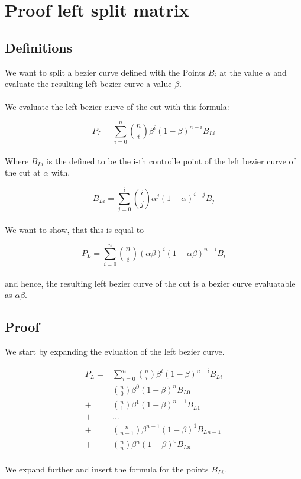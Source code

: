 \section{Proof left split matrix}
\label{sec:proofsplittingmatrix}

\subsection{Definitions}
We want to split a bezier curve defined with the Points $B_i$ at the value $\alpha$ and evaluate the resulting left bezier curve a value $\beta$.
\\
\\
We evaluate the left bezier curve of the cut with this formula:

\begin{equation*}
    P_L = \sum _{i=0}^{n} \binom{n}{i}\beta^{i}(1-\beta)^{n-i}B_{Li}
\end{equation*}
\\
Where $B_{Li}$ is the defined to be the i-th controlle point of the left bezier curve of the cut at $\alpha$ with.

\begin{equation*}
    B_{Li} = \sum _{j=0}^{i} \binom{i}{j}\alpha^{j}(1-\alpha)^{i-j}B_j
\end{equation*}
\\
We want to show, that this is equal to

\begin{equation*}
    P_L = \sum _{i=0}^{n} \binom{n}{i}(\alpha\beta)^{i}(1-\alpha\beta)^{n-i}B_i
\end{equation*}
\\
and hence, the resulting left bezier curve of the cut is a bezier curve evaluatable as $\alpha\beta$.

\subsection{Proof}

We start by expanding the evluation of the left bezier curve.

\begin{align*}
    P_L = & \sum _{i=0}^{n} \binom{n}{i}\beta^{i}(1-\beta)^{n-i}B_{Li} \\
    =     & \binom{n}{0}\beta^{0}(1-\beta)^{n}B_{L0}                   \\
    +     & \binom{n}{1}\beta^{1}(1-\beta)^{n-1}B_{L1}                 \\
    +     & \hdots                                                     \\
    +     & \binom{n}{n-1}\beta^{n-1}(1-\beta)^{1}B_{Ln-1}             \\
    +     & \binom{n}{n}\beta^{n}(1-\beta)^{0}B_{Ln}
\end{align*}
\\We expand further and insert the formula for the points $B_{Li}$.

